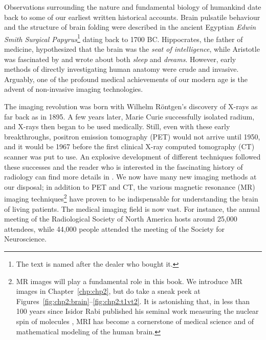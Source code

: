%
%

\preface

Observations surrounding the nature and fundamental biology of
humankind date back to some of our earliest written historical
accounts. Brain pulsatile behaviour and the structure of brain folding
were described in the ancient Egyptian \textit{Edwin Smith Surgical
Papyrus}\footnote{The text is named after the dealer who bought it.}
dating back to 1700 BC. Hippocrates, the father of medicine,
hypothesized that the brain was the \textit{seat of intelligence},
while Aristotle was fascinated by and wrote about both \textit{sleep}
and \textit{dreams}. However, early methods of directly investigating
human anatomy were crude and invasive.  Arguably, one of the profound
medical achievements of our modern age is the advent of non-invasive
imaging technologies.

The imaging revolution was born with Wilhelm R{\"o}ntgen's discovery
of X-rays as far back as in 1895. A few years later, Marie Curie
successfully isolated radium, and X-rays then began to be used
medically. Still, even with these early breakthroughs, positron
emission tomography (PET) would not arrive until 1950, and it would be
1967 before the first clinical X-ray computed tomography (CT) scanner
was put to use. An explosive development of different techniques
followed these successes and the reader who is interested in the
fascinating history of radiology can find more details
in \cite{thomas2013}. We now have many new imaging methods at our
disposal; in addition to PET and CT, the various magnetic resonance
(MR) imaging techniques\footnote{MR images will play a fundamental
role in this book. We introduce MR images in Chapter~\ref{chp:chp2},
but do take a sneak peek at
Figures~\ref{fig:chp2:brain}--\ref{fig:chp2:t1vt2}. It is astonishing
that, in less than 100 years since Isidor Rabi published his seminal
work measuring the nuclear spin of molecules \cite{thomas2013}, MRI
has become a cornerstone of medical science and of mathematical
modeling of the human brain.} have proven to be indispensable for
understanding the brain of living patients. The medical imaging field
is now vast. For instance, the annual meeting of the Radiological
Society of North America hosts around 25,000 attendees, while 44,000
people attended the meeting of the Society for Neuroscience.

